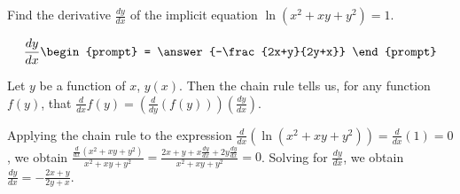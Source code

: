 \documentclass{ximera}
\author{Gregory Hartman \and Matthew Carr}
\begin{document}
\begin{exercise}




Find the derivative $\frac{dy}{dx}$ of the implicit equation $\ln(x^2+xy+y^2)=1$.

\[
\frac{dy}{dx}
\begin{prompt}
= \answer{-\frac{2x+y}{2y+x}}
\end{prompt}
\]

\begin{hint}
Let $y$ be a function of $x$, $y(x)$. Then the chain rule tells us, for any function $f(y)$, that $\frac{d}{dx}f(y)=\left(\frac{d}{dy}\left(f(y)\right)\right)\left(\frac{dy}{dx}\right)$. 
\end{hint}

\begin{hint}
Applying the chain rule to the expression $\frac{d}{dx}(\ln(x^2+xy+y^2))=\frac{d}{dx}(1)=0$, we obtain $\frac{\frac{d}{dx}(x^2+xy+y^2)}{x^2+xy+y^2}=\frac{2x+y+x\frac{dy}{dx}+2y\frac{dy}{dx}}{x^2+xy+y^2}=0$. Solving for $\frac{dy}{dx}$, we obtain $\frac{dy}{dx}=-\frac{2x+y}{2y+x}$.
\end{hint}

\end{exercise}
\end{document}
